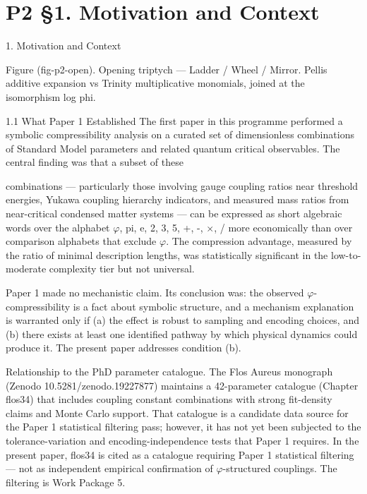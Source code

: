 
\section{P2 §1. Motivation and Context}

1. Motivation and Context

      Figure (fig-p2-open). Opening triptych --- Ladder / Wheel / Mirror. Pellis additive expansion vs
                   Trinity multiplicative monomials, joined at the isomorphism log phi.

  1.1 What Paper 1 Established
  The first paper in this programme performed a symbolic compressibility analysis on a
  curated set of dimensionless combinations of Standard Model parameters and related
  quantum critical observables. The central finding was that a subset of these

  combinations --- particularly those involving gauge coupling ratios near threshold
  energies, Yukawa coupling hierarchy indicators, and measured mass ratios from
  near-critical condensed matter systems --- can be expressed as short algebraic words
  over the alphabet {$\varphi$, pi, e, 2, 3, 5, +, -, $\times$, /} more economically than over comparison
  alphabets that exclude $\varphi$. The compression advantage, measured by the ratio of
  minimal description lengths, was statistically significant in the low-to-moderate
  complexity tier but not universal.

  Paper 1 made no mechanistic claim. Its conclusion was: the observed $\varphi$-compressibility
  is a fact about symbolic structure, and a mechanism explanation is warranted only if (a)
  the effect is robust to sampling and encoding choices, and (b) there exists at least one
  identified pathway by which physical dynamics could produce it. The present paper
  addresses condition (b).

  Relationship to the PhD parameter catalogue. The Flos Aureus monograph (Zenodo
  10.5281/zenodo.19227877) maintains a 42-parameter catalogue (Chapter flos34) that
  includes coupling constant combinations with strong fit-density claims and Monte Carlo
  support. That catalogue is a candidate data source for the Paper 1 statistical filtering
  pass; however, it has not yet been subjected to the tolerance-variation and
  encoding-independence tests that Paper 1 requires. In the present paper, flos34 is cited
  as a catalogue requiring Paper 1 statistical filtering --- not as independent empirical
  confirmation of $\varphi$-structured couplings. The filtering is Work Package 5.

